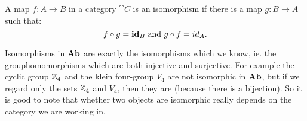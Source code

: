 \begin{definition}
	A map $f: A \to B$ in a category $\cat{C}$ is an isomorphism if there is a map $g: B \to A$ such that:
	$$ f \circ g = \mathbf{id}_B \text{ and } g \circ f = id_A.$$
\end{definition}

Isomorphisms in $\mathbf{Ab}$ are exactly the isomorphisms which we know, ie. the grouphomomorphisms which are both injective and surjective.
For example the cyclic group $\mathbb{Z}_4$ and the klein four-group $V_4$ are not isomorphic in $\mathbf{Ab}$, but if we regard only the sets $\mathbb{Z}_4$ and $V_4$, then they are (because there is a bijection). So it is good to note that whether two objects are isomorphic  really depends on the category we are working in.

